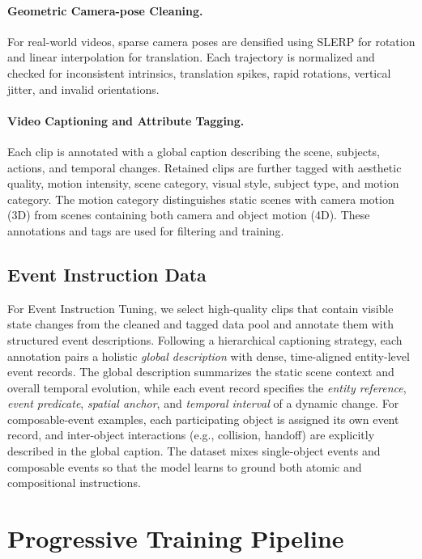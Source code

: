 \documentclass{llmxive}
\begin{document}
\paragraph{\bf{Geometric Camera-pose Cleaning.}}
For real-world videos, sparse camera poses are densified using SLERP for rotation and linear interpolation for translation. Each trajectory is normalized and checked for inconsistent intrinsics, translation spikes, rapid rotations, vertical jitter, and invalid orientations.

\paragraph{\bf{Video Captioning and Attribute Tagging.}}
Each clip is annotated with a global caption describing the scene, subjects, actions, and temporal changes. Retained clips are further tagged with aesthetic quality, motion intensity, scene category, visual style, subject type, and motion category. The motion category distinguishes static scenes with camera motion (3D) from scenes containing both camera and object motion (4D). These annotations and tags are used for filtering and training.

\subsection{Event Instruction Data}
\label{sec:event-data}

For Event Instruction Tuning, we select high-quality clips that contain visible state
changes from the cleaned and tagged data pool and annotate them with structured event
descriptions.
Following a hierarchical captioning strategy, each annotation pairs a holistic
\emph{global description} with dense, time-aligned entity-level event records.
The global description summarizes the static scene context and overall temporal evolution,
while each event record specifies the \emph{entity reference}, \emph{event predicate},
\emph{spatial anchor}, and \emph{temporal interval} of a dynamic change.
For composable-event examples, each participating object is assigned its own event record,
and inter-object interactions (e.g., collision, handoff) are explicitly described in the
global caption.
The dataset mixes single-object events and composable events so that the model learns to
ground both atomic and compositional instructions.


\section{Progressive Training Pipeline}
\end{document}
